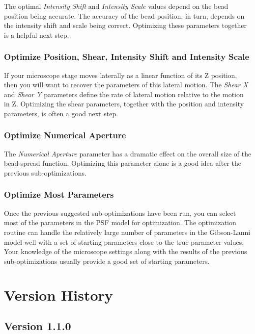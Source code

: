 \documentclass[11pt,titlepage,twoside]{article}
\begin{document}
The optimal \emph{Intensity Shift} and \emph{Intensity Scale} values depend on the bead position being accurate. The accuracy of the bead position, in turn, depends on the intensity shift and scale being correct. Optimizing these parameters together is a helpful next step.

\subsubsection{Optimize Position, Shear, Intensity Shift and Intensity Scale}

If your microscope stage moves laterally as a linear function of its Z position, then you will want to recover the parameters of this lateral motion. The \emph{Shear X} and \emph{Shear Y} parameters define the rate of lateral motion relative to the motion in Z. Optimizing the shear parameters, together with the position and intensity parameters, is often a good next step.

\subsubsection{Optimize Numerical Aperture}

The \emph{Numerical Aperture} parameter has a dramatic effect on the overall size of the bead-spread function. Optimizing this parameter alone is a good idea after the previous sub-optimizations.

\subsubsection{Optimize Most Parameters}

Once the previous suggested sub-optimizations have been run, you can select most of the parameters in the PSF model for optimization. The optimization routine can handle the relatively large number of parameters in the Gibson-Lanni model well with a set of starting parameters close to the true parameter values. Your knowledge of the microscope settings along with the results of the previous sub-optimizations usually provide a good set of starting parameters.

\section{Version History}

\subsection{Version 1.1.0}
\end{document}
